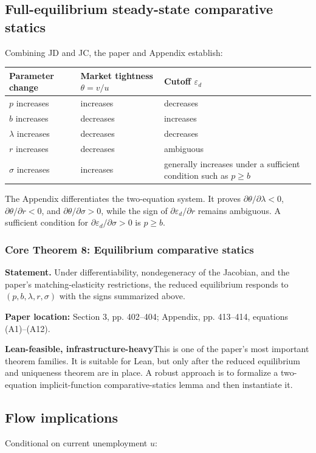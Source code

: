 \documentclass[11pt]{article}
\newcommand{\leaninfra}{\textcolor{darkamber}{\textbf{Lean-feasible, infrastructure-heavy}}}
\newcommand{\papersec}[1]{\textbf{Paper location:} #1}
\newcommand{\statusbox}[2]{\colorbox{#1}{\parbox{0.94\linewidth}{#2}}}
\newcommand{\epsd}{\varepsilon_d}
\begin{document}
\subsection{Full-equilibrium steady-state comparative statics}
Combining JD and JC, the paper and Appendix establish:

\begin{center}
\begin{tabularx}{0.96\textwidth}{@{}lXX@{}}
\toprule
Parameter change & Market tightness $\theta=v/u$ & Cutoff $\epsd$ \\
\midrule
$p$ increases & increases & decreases \\
$b$ increases & decreases & increases \\
$\lambda$ increases & decreases & decreases \\
$r$ increases & decreases & ambiguous \\
$\sigma$ increases & increases & generally increases under a sufficient condition such as $p\ge b$ \\
\bottomrule
\end{tabularx}
\end{center}

The Appendix differentiates the two-equation system. It proves $\partial\theta/\partial\lambda<0$, $\partial\theta/\partial r<0$, and $\partial\theta/\partial\sigma>0$, while the sign of $\partial\epsd/\partial r$ remains ambiguous. A sufficient condition for $\partial\epsd/\partial\sigma>0$ is $p\ge b$.

\subsubsection*{Core Theorem 8: Equilibrium comparative statics}
\textbf{Statement.} Under differentiability, nondegeneracy of the Jacobian, and the paper's matching-elasticity restrictions, the reduced equilibrium responds to $(p,b,\lambda,r,\sigma)$ with the signs summarized above.

\papersec{Section 3, pp. 402--404; Appendix, pp. 413--414, equations (A1)--(A12).}

\statusbox{softamber}{\leaninfra\quad This is one of the paper's most important theorem families. It is suitable for Lean, but only after the reduced equilibrium and uniqueness theorem are in place. A robust approach is to formalize a two-equation implicit-function comparative-statics lemma and then instantiate it.}

\subsection{Flow implications}
Conditional on current unemployment $u$:
\end{document}
